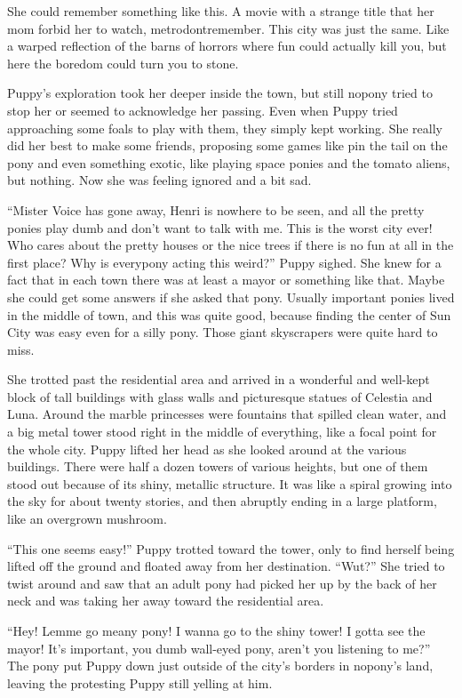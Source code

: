 She could remember something like this. A movie with a strange title that her mom forbid her to watch, metrodontremember. This city was just the same. Like a warped reflection of the barns of horrors where fun could actually kill you, but here the boredom could turn you to stone.

Puppy's exploration took her deeper inside the town, but still nopony tried to stop her or seemed to acknowledge her passing. Even when Puppy tried approaching some foals to play with them, they simply kept working. She really did her best to make some friends, proposing some games like pin the tail on the pony and even something exotic, like playing space ponies and the tomato aliens, but nothing. Now she was feeling ignored and a bit sad.

``Mister Voice has gone away, Henri is nowhere to be seen, and all the pretty ponies play dumb and don't want to talk with me. This is the worst city ever! Who cares about the pretty houses or the nice trees if there is no fun at all in the first place? Why is everypony acting this weird?'' Puppy sighed. She knew for a fact that in each town there was at least a mayor or something like that. Maybe she could get some answers if she asked that pony. Usually important ponies lived in the middle of town, and this was quite good, because finding the center of Sun City was easy even for a silly pony. Those giant skyscrapers were quite hard to miss.

She trotted past the residential area and arrived in a wonderful and well-kept block of tall buildings with glass walls and picturesque statues of Celestia and Luna. Around the marble princesses were fountains that spilled clean water, and a big metal tower stood right in the middle of everything, like a focal point for the whole city. Puppy lifted her head as she looked around at the various buildings. There were half a dozen towers of various heights, but one of them stood out because of its shiny, metallic structure. It was like a spiral growing into the sky for about twenty stories, and then abruptly ending in a large platform, like an overgrown mushroom.

``This one seems easy!'' Puppy trotted toward the tower, only to find herself being lifted off the ground and floated away from her destination. ``Wut?'' She tried to twist around and saw that an adult pony had picked her up by the back of her neck and was taking her away toward the residential area.

``Hey! Lemme go meany pony! I wanna go to the shiny tower! I gotta see the mayor! It's important, you dumb wall-eyed pony, aren't you listening to me?'' The pony put Puppy down just outside of the city's borders in nopony's land, leaving the protesting Puppy still yelling at him.


